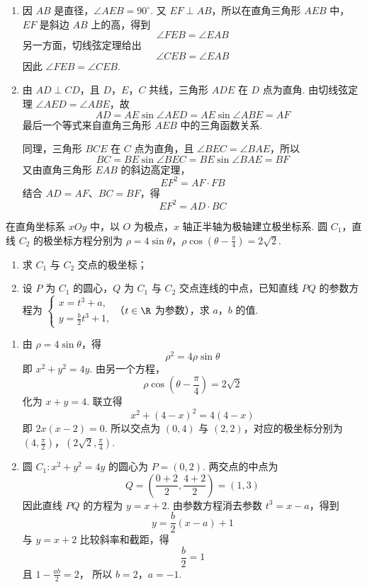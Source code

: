 \begin{solution}
\begin{enumerate}
\item 因 \(AB\) 是直径，\(\angle AEB=90^\circ\). 又 \(EF\perp AB\)，所以在直角三角形
\(AEB\) 中，\(EF\) 是斜边 \(AB\) 上的高，得到
\[
\angle FEB=\angle EAB
\]
另一方面，切线弦定理给出
\[
\angle CEB=\angle EAB
\]
因此 \(\angle FEB=\angle CEB\).

\item 由 \(AD\perp CD\)，且 \(D\)，\(E\)，\(C\) 共线，三角形 \(ADE\) 在 \(D\) 点为直角. 由切线弦定理
\(\angle AED=\angle ABE\)，故
\[
AD=AE\sin\angle AED=AE\sin\angle ABE=AF
\]
最后一个等式来自直角三角形 \(AEB\) 中的三角函数关系.

同理，三角形 \(BCE\) 在 \(C\) 点为直角，且
\(\angle BEC=\angle BAE\)，所以
\[
BC=BE\sin\angle BEC=BE\sin\angle BAE=BF
\]
又由直角三角形 \(EAB\) 的斜边高定理，
\[
EF^2=AF\cdot FB
\]
结合 \(AD=AF\)、\(BC=BF\)，得
\[
EF^2=AD\cdot BC
\]
\end{enumerate}
\end{solution}

\begin{problem}
在直角坐标系 \(xOy\) 中，以 \(O\) 为极点，\(x\) 轴正半轴为极轴建立极坐标系. 圆 \(C_{1}\)，直线 \(C_{2}\) 的极坐标方程分别为 \(\rho = 4\sin \theta\)，\(\rho \cos \left(\theta - \frac{\pi}{4}\right) = 2\sqrt{2}\).

\begin{enumerate}
\item 求 \(C_{1}\) 与 \(C_{2}\) 交点的极坐标；
\item 设 \(P\) 为 \(C_{1}\) 的圆心，\(Q\) 为 \(C_{1}\) 与 \(C_{2}\) 交点连线的中点，已知直线 \(PQ\) 的参数方程为 \(\begin{cases}
x = t^3 + a,\\
y = \frac{b}{2} t^3 + 1,
\end{cases}\)（\(t \in \R\) 为参数），求 \(a\)，\(b\) 的值.
\end{enumerate}
\end{problem}

\begin{solution}
\begin{enumerate}
\item 由 \(\rho=4\sin\theta\)，得
\[
\rho^2=4\rho\sin\theta
\]
即 \(x^2+y^2=4y\).
由另一个方程，
\[
\rho\cos\left(\theta-\frac\pi4\right)=2\sqrt2
\]
化为 \(x+y=4\). 联立得
\[
x^2+(4-x)^2=4(4-x)
\]
即 \(2x(x-2)=0\). 所以交点为 \((0,4)\) 与 \((2,2)\)，对应的极坐标分别为
\(\left(4,\frac\pi2\right)\)，\(\left(2\sqrt2,\frac\pi4\right)\).

\item 圆 \(C_1:x^2+y^2=4y\) 的圆心为 \(P=(0,2)\). 两交点的中点为
\[
Q=\left(\frac{0+2}{2},\frac{4+2}{2}\right)=(1,3)
\]
因此直线 \(PQ\) 的方程为 \(y=x+2\). 由参数方程消去参数
\(t^3=x-a\)，得到
\[
y=\frac b2(x-a)+1
\]
与 \(y=x+2\) 比较斜率和截距，得
\[
\frac b2=1
\]
且 \(1-\frac{ab}{2}=2\)，
所以 \(b=2\)，\(a=-1\).
\end{enumerate}
\end{solution}


